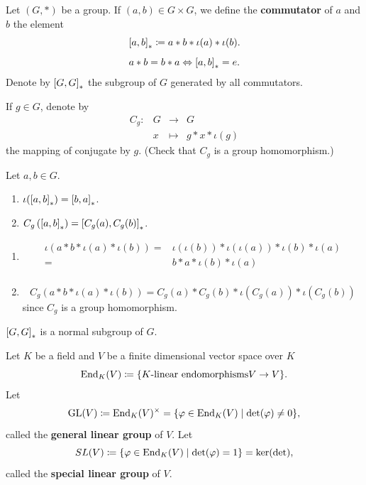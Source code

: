 \begin{definitionenv}
    Let $(G,*)$ be a group.
    If $(a,b) \in G \times G$, we define the \textbf{commutator} of $a$ and $b$ the element
    $$\left[a, b\right]_{*}\coloneq a * b * \iota (a) * \iota(b).$$
    $$a * b = b * a \Leftrightarrow \left[a, b\right]_{*} = e.$$
    Denote by $\left[G, G\right]_{*}$ the subgroup of $G$ generated by all commutators.

    \quad If $g \in G$, denote by
    $$\begin{array}{rrcl}
        C_{g} : & G & \longrightarrow & G\\
        & x & \longmapsto & g * x * \iota(g)
    \end{array}$$
    the mapping of conjugate by $g$.
    (Check that $C_g$ is a group homomorphism.)
\end{definitionenv}

\begin{propositionenv}
    Let $a,b \in G$.
    \begin{enumerate}[label=(\arabic*)]
        \item $\iota(\left[a, b\right]_{*}) = \left[b, a\right]_{*}$.
        \item $C_g\left(\left[a, b\right]_{*}\right) = \left[C_g(a), C_g(b)\right]_{*}$.
    \end{enumerate}
\end{propositionenv}
\begin{proofenv}
    \quad
    \begin{enumerate}[label=(\arabic*)]
        \item $$\begin{aligned}
            \iota(a * b * \iota(a) * \iota(b)) = & \iota(\iota (b)) * \iota(\iota(a)) * \iota(b) * \iota(a)\\
            = & b * a * \iota(b) * \iota(a)\\
        \end{aligned}$$
        \item $$C_g(a * b * \iota(a) * \iota(b)) = C_g(a) * C_g(b) * \iota(C_g(a)) * \iota(C_g(b))$$
            since $C_{g}$ is a group homomorphism.

    \end{enumerate}
\end{proofenv}

\begin{corollaryenv}
    $\left[G, G\right]_{*}$ is a normal subgroup of $G$.
\end{corollaryenv}

\begin{definitionenv}
    Let $K$ be a field and $V$ be a finite dimensional vector space over $K$
    $$\operatorname{\mathrm{End}}_{K}(V) \coloneq \{K\text{-linear endomorphisms} V \rightarrow V\}.$$
    Let
    $$\operatorname{\mathrm{GL}}(V) \coloneq \operatorname{\mathrm{End}}_{K}(V)^\times = \{\varphi \in \operatorname{\mathrm{End}}_{K}(V) \mid \det (\varphi) \neq 0\},$$
    called the \textbf{general linear group} of $V$.
    Let
    $$SL(V) \coloneq \{\varphi \in \operatorname{\mathrm{End}}_{K}(V) \mid \det (\varphi) = 1\} = \ker (\det),$$
    called the \textbf{special linear group} of $V$.
\end{definitionenv}

